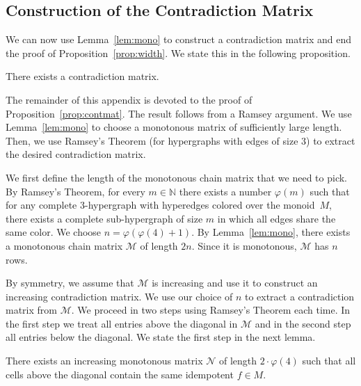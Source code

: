 \documentclass[envcountsame]{llncs}
\newcommand\nat{\ensuremath{\mathbb{N}}\xspace}
\newcommand\mat{\ensuremath{\mathscr{M}}\xspace}
\newcommand\mnat{\ensuremath{\mathscr{N}}\xspace}
\newcommand\chain{chain\xspace}
\begin{document}
\subsection{Construction of the Contradiction Matrix}  

We can now use Lemma~\ref{lem:mono} to construct a contradiction
matrix and end the proof of Proposition~\ref{prop:width}. We state
this in the following proposition.

\begin{proposition} \label{prop:contmat}
  There exists a contradiction matrix.
\end{proposition}

The remainder of this appendix is devoted to the proof of
Proposition~\ref{prop:contmat}. The result follows from a Ramsey
argument. We use Lemma~\ref{lem:mono} to choose a monotonous matrix of
sufficiently large length. Then, we use Ramsey's Theorem (for
hypergraphs with edges of size $3$) to extract the desired
contradiction matrix.

We first define the length of the monotonous \chain matrix that we need to
pick. By Ramsey's Theorem, for every $m \in \nat$ there exists a number
$\varphi(m)$ such that for any complete 3-hypergraph with hyperedges colored
over the monoid~$M$, there exists a complete sub-hypergraph of size $m$ in
which all edges share the same color. We choose $n = \varphi(\varphi(4)+1)$. By Lemma~\ref{lem:mono}, there exists a monotonous
\chain matrix \mat of length $2n$. Since it is monotonous, \mat has $n$ rows.

By symmetry, we assume that \mat is increasing and use it to construct an
increasing contradiction matrix.  We use our choice of $n$ to extract a
contradiction matrix from \mat. We proceed in two steps using Ramsey's Theorem
each time. In the first step we treat all entries above the diagonal in \mat
and in the second step all entries below the diagonal. We state the first step
in the next lemma.

\begin{lemma} \label{lem:matlemma}
  There exists an increasing monotonous matrix \mnat of length $2 \cdot
  \varphi(4)$ such that all cells above the diagonal contain the same
  idempotent $f \in M$.
\end{lemma}
\end{document}
